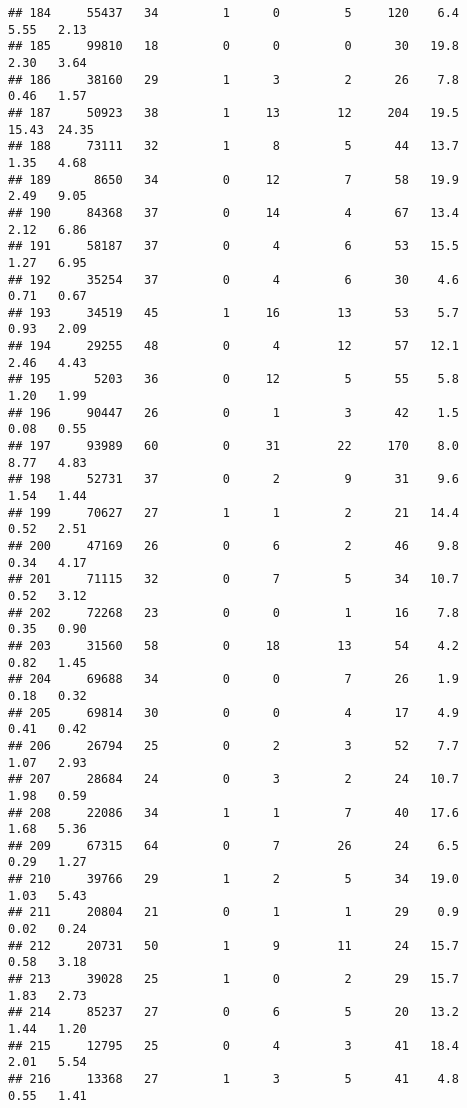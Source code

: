 \documentclass[
]{article}
\begin{document}
\begin{verbatim}
## 184     55437   34         1      0         5     120    6.4    5.55   2.13
## 185     99810   18         0      0         0      30   19.8    2.30   3.64
## 186     38160   29         1      3         2      26    7.8    0.46   1.57
## 187     50923   38         1     13        12     204   19.5   15.43  24.35
## 188     73111   32         1      8         5      44   13.7    1.35   4.68
## 189      8650   34         0     12         7      58   19.9    2.49   9.05
## 190     84368   37         0     14         4      67   13.4    2.12   6.86
## 191     58187   37         0      4         6      53   15.5    1.27   6.95
## 192     35254   37         0      4         6      30    4.6    0.71   0.67
## 193     34519   45         1     16        13      53    5.7    0.93   2.09
## 194     29255   48         0      4        12      57   12.1    2.46   4.43
## 195      5203   36         0     12         5      55    5.8    1.20   1.99
## 196     90447   26         0      1         3      42    1.5    0.08   0.55
## 197     93989   60         0     31        22     170    8.0    8.77   4.83
## 198     52731   37         0      2         9      31    9.6    1.54   1.44
## 199     70627   27         1      1         2      21   14.4    0.52   2.51
## 200     47169   26         0      6         2      46    9.8    0.34   4.17
## 201     71115   32         0      7         5      34   10.7    0.52   3.12
## 202     72268   23         0      0         1      16    7.8    0.35   0.90
## 203     31560   58         0     18        13      54    4.2    0.82   1.45
## 204     69688   34         0      0         7      26    1.9    0.18   0.32
## 205     69814   30         0      0         4      17    4.9    0.41   0.42
## 206     26794   25         0      2         3      52    7.7    1.07   2.93
## 207     28684   24         0      3         2      24   10.7    1.98   0.59
## 208     22086   34         1      1         7      40   17.6    1.68   5.36
## 209     67315   64         0      7        26      24    6.5    0.29   1.27
## 210     39766   29         1      2         5      34   19.0    1.03   5.43
## 211     20804   21         0      1         1      29    0.9    0.02   0.24
## 212     20731   50         1      9        11      24   15.7    0.58   3.18
## 213     39028   25         1      0         2      29   15.7    1.83   2.73
## 214     85237   27         0      6         5      20   13.2    1.44   1.20
## 215     12795   25         0      4         3      41   18.4    2.01   5.54
## 216     13368   27         1      3         5      41    4.8    0.55   1.41

\end{verbatim}
\end{document}
